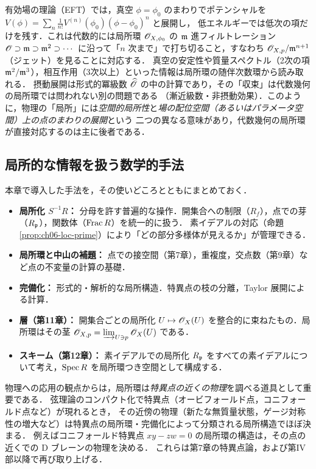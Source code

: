 \begin{physbox}[有効場の理論と完備化]
有効場の理論（EFT）では，真空 $\phi=\phi_0$ のまわりでポテンシャルを $V(\phi)=\sum_n\frac{1}{n!}V^{(n)}(\phi_0)(\phi-\phi_0)^n$ と展開し，
低エネルギーでは低次の項だけを残す．これは代数的には局所環 $\mathscr{O}_{X,\phi_0}$ の $\mathfrak{m}$ 進フィルトレーション
$\mathscr{O}\supset\mathfrak{m}\supset\mathfrak{m}^2\supset\cdots$ に沿って「$n$ 次まで」で打ち切ること，すなわち $\mathscr{O}_{X,p}/\mathfrak{m}^{n+1}$（ジェット）を見ることに対応する．
真空の安定性や質量スペクトル（2次の項 $\mathfrak{m}^2/\mathfrak{m}^3$），相互作用（3次以上）といった情報は局所環の随伴次数環から読み取れる．
摂動展開は形式的冪級数 $\widehat{\mathscr{O}}$ の中の計算であり，その「収束」は代数幾何の局所環では問われない別の問題である
（漸近級数・非摂動効果）．このように，物理の「局所」には\emph{空間的局所性}と\emph{場の配位空間（あるいはパラメータ空間）上の点のまわりの展開}という
二つの異なる意味があり，代数幾何の局所環が直接対応するのは主に後者である．
\end{physbox}

\subsection{局所的な情報を扱う数学的手法}

本章で導入した手法を，その使いどころとともにまとめておく．
\begin{itemize}
  \item \textbf{局所化 $S^{-1}R$：} 分母を許す普遍的な操作．開集合への制限（$R_f$），点での芽（$R_{\mathfrak{p}}$），関数体（$\operatorname{Frac} R$）を統一的に扱う．
        素イデアルの対応（命題 \ref{prop:ch06-loc-prime}）により「どの部分多様体が見えるか」が管理できる．
  \item \textbf{局所環と中山の補題：} 点での接空間（第7章），重複度，交点数（第9章）など点の不変量の計算の基礎．
  \item \textbf{完備化：} 形式的・解析的な局所構造．特異点の枝の分離，Taylor 展開による計算．
  \item \textbf{層（第11章）：} 開集合ごとの局所化 $U\mapsto\mathscr{O}_X(U)$ を整合的に束ねたもの．局所環はその茎 $\mathscr{O}_{X,p}=\varinjlim_{U\ni p}\mathscr{O}_X(U)$ である．
  \item \textbf{スキーム（第12章）：} 素イデアルでの局所化 $R_{\mathfrak{p}}$ をすべての素イデアルについて考え，$\operatorname{Spec} R$ を局所環つき空間として構成する．
\end{itemize}

物理への応用の観点からは，局所環は\emph{特異点の近くの物理}を調べる道具として重要である．
弦理論のコンパクト化で特異点（オービフォールド点，コニフォールド点など）が現れるとき，
その近傍の物理（新たな無質量状態，ゲージ対称性の増大など）は特異点の局所環・完備化によって分類される局所構造でほぼ決まる．
例えばコニフォールド特異点 $xy-zw=0$ の局所環の構造は，その点の近くでの D ブレーンの物理を決める．
これらは第7章の特異点論，および第IV部以降で再び取り上げる．


